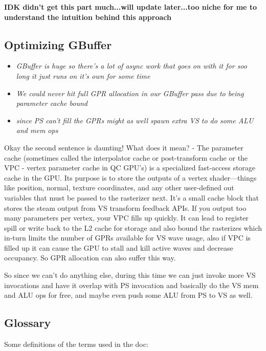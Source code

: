 \documentclass[14pt]{article}
\begin{document}
\textbf{IDK didn't get this part much...will update later...too niche for me to understand the intuition behind this approach}

\subsection*{Optimizing GBuffer}

\begin{itemize}
	\item \textit{GBuffer is huge so there's a lot of async work that goes on with it for soo long it just runs on it's own for some time}
	
	\item \textit{We could never hit full GPR allocation in our GBuffer pass due to being parameter cache bound}
	
	\item \textit{since PS can't fill the GPRs might as well spawn extra VS to do some ALU and mem ops}
\end{itemize}

Okay the second sentence is daunting! What does it mean? - The parameter cache (sometimes called the interpolator cache or post-transform cache or the VPC - vertex parameter cache in QC GPU's) is a specialized fast-access storage cache in the GPU. Its purpose is to store the outputs of a vertex shader—things like position, normal, texture coordinates, and any other user-defined out variables that must be passed to the rasterizer next. It's a small cache block that stores the steam output from VS transform feedback APIs. If you output too many parameters per vertex, your VPC fills up quickly. It can lead to register spill or write back to the L2 cache for storage and also bound the rasterizes which in-turn limits the number of GPRs available for VS wave usage, also if VPC is filled up it can cause the GPU to stall and kill active waves and decrease occupancy. So GPR allocation can also suffer this way. 

So since we can't do anything else, during this time we can just invoke more VS invocations and have it overlap with PS invocation and basically do the VS mem and ALU ops for free, and maybe even push some ALU from PS to VS as well.


\subsection*{Glossary}
Some definitions of the terms used in the doc: \\
\end{document}
